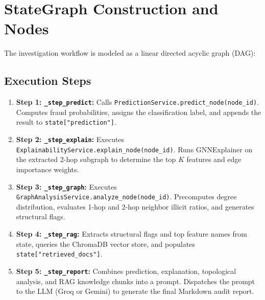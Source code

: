 \documentclass[11pt,a4paper]{report}
\begin{document}
\section{StateGraph Construction and Nodes}
The investigation workflow is modeled as a linear directed acyclic graph (DAG):
\begin{center}
\end{center}

\subsection{Execution Steps}
\begin{enumerate}[leftmargin=1.5em]
  \item \textbf{Step 1: \texttt{\_step\_predict}:}
  Calls \texttt{PredictionService.predict\_node(node\_id)}. Computes fraud probabilities, assigns the classification label, and appends the result to \texttt{state["prediction"]}.
  \item \textbf{Step 2: \texttt{\_step\_explain}:}
  Executes \texttt{ExplainabilityService.explain\_node(node\_id)}. Runs GNNExplainer on the extracted 2-hop subgraph to determine the top $K$ features and edge importance weights.
  \item \textbf{Step 3: \texttt{\_step\_graph}:}
  Executes \texttt{GraphAnalysisService.analyze\_node(node\_id)}. Precomputes degree distribution, evaluates 1-hop and 2-hop neighbor illicit ratios, and generates structural flags.
  \item \textbf{Step 4: \texttt{\_step\_rag}:}
  Extracts structural flags and top feature names from state, queries the ChromaDB vector store, and populates \texttt{state["retrieved\_docs"]}.
  \item \textbf{Step 5: \texttt{\_step\_report}:}
  Combines prediction, explanation, topological analysis, and RAG knowledge chunks into a prompt. Dispatches the prompt to the LLM (Groq or Gemini) to generate the final Markdown audit report.
\end{enumerate}
\end{document}
